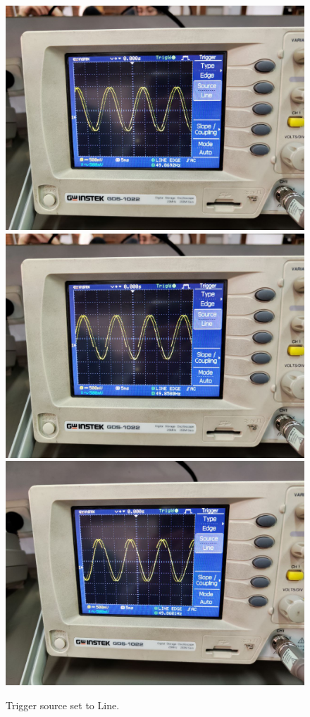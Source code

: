 \documentclass[11pt]{article}
\begin{document}
\begin{question}
{        \begin{figure}[H]
            \begin{center}
                \includegraphics[scale=0.1]{Fig/42.jpeg}
                \includegraphics[scale=0.1]{Fig/43.jpeg}
                \includegraphics[scale=0.1]{Fig/44.jpeg}
                \caption{Trigger source set to Line.}
            \end{center}
        \end{figure}
    }


\end{question}
\end{document}
